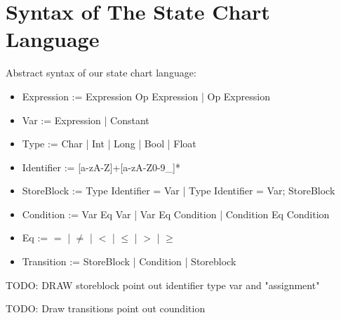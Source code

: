 \section{Syntax of The State Chart Language}

Abstract syntax of our state chart language:

\begin{itemize}
	\item Expression := Expression Op Expression | Op Expression
	\item Var := Expression | Constant
	\item Type := Char | Int | Long | Bool | Float
	\item Identifier := [a-zA-Z]+[a-zA-Z0-9_]*  
	
	\item StoreBlock := Type Identifier = Var | Type Identifier = Var; StoreBlock

	\item Condition := Var Eq Var | Var Eq Condition | Condition Eq Condition
	
	\item Eq := $=$ | $\neq$ | $<$ | $\leq$ | $>$ | $\geq$	
	
	\item Transition := StoreBlock | Condition | Storeblock
	
\end{itemize}

TODO: DRAW storeblock point out identifier type var and "assignment"

TODO: Draw transitions point out coundition

